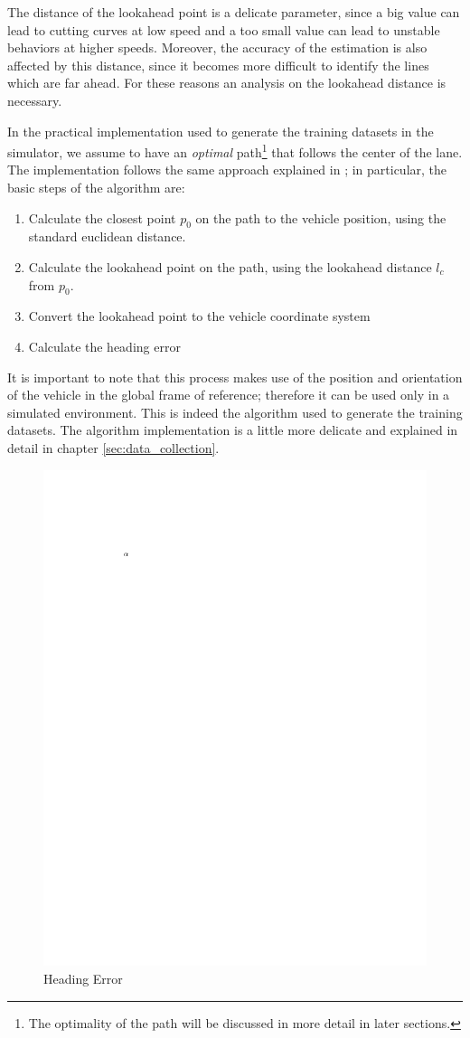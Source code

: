 \documentclass[a4paper,12pt,sort&compress]{article}
\begin{document}
    The distance of the lookahead point
    is a delicate parameter, since a big value can lead to cutting curves at low
    speed and a too small value can lead to unstable behaviors at higher speeds.
    Moreover, the accuracy of the estimation is also affected by this distance,
    since it becomes more difficult to identify the lines which are far ahead.
    For these reasons an analysis on the lookahead distance is necessary. 

    In the practical implementation used to generate the training datasets in
    the simulator, we assume to have an \textit{optimal} path\footnote{The optimality of the path will be discussed in
    more detail in later sections.} that follows the center of the lane. The
    implementation follows the same approach explained in
    \citep*{coulter1992implementation}; in particular, the basic steps of the
    algorithm are:
    \begin{enumerate}
        \item Calculate the closest point $p_0$ on the path to the vehicle position,
        using the standard euclidean distance.
        \item Calculate the lookahead point on the path, using the lookahead
        distance $l_c$ from $p_0$.
        \item Convert the lookahead point to the vehicle coordinate system
        \item Calculate the heading error
    \end{enumerate}
    It is important to note that this process makes use of the position and
    orientation of the vehicle in the global frame of reference; therefore it
    can be used only in a simulated environment. This is indeed the algorithm
    used to generate the training datasets. The algorithm implementation is a little more delicate
    and explained in detail in chapter \ref{sec:data_collection}.

    \begin{figure}
        \centering
        \includegraphics[width=0.6\linewidth]{a.pdf}
        \caption{Heading Error}
        \label{fig:heading_error}
    \end{figure}
\end{document}
